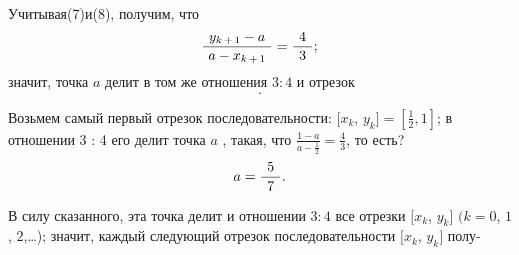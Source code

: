 \begin{minipage}[t]{0.45\linewidth}
Учитывая\hspace{2mm}(7)\hspace{2mm}и\hspace{2mm}(8), получим, что
\begin{equation}
    \frac{\hspace{1.5mm}y_{k\hspace{0.5mm}+\hspace{0.5mm}1} - a\hspace{1.5mm}}{a - x_{k\hspace{0.5mm}+\hspace{0.5mm}1}} = \frac{\hspace{1.5mm}4\hspace{1.5mm}}{3};
\end{equation}
значит, точка $a$ делит в том же отношения $3:4$ и отрезок
\begin{equation*}
    [x_{k + 1}, \hspace{1mm}y_{k+1}].
\end{equation*}

Возьмем самый первый отрезок последовательности: $[x_k$, \hspace{1mm}$y_k] = [\frac{1}{2},1]$; в отношении 3 : 4 
его делит точка $a$ , такая, что $\frac{1 - a}{a - \frac{1}{2}} = \frac{4}{3}$, то есть?
\begin{equation}
    a = \frac{\hspace{1.5mm}5\hspace{1.5mm}}{7}.
\end{equation}

В силу сказанного, эта точка делит и отношении $3:4$ все отрезки $[x_k$, \hspace{1mm}$y_k]$ \hspace{1mm}$(k = 0$, \hspace{1mm}$1$, \hspace{1mm}$2$,\hspace{1mm}\ldots); значит, каждый следующий отрезок последовательности $[x_k$, \hspace{1mm}$y_k]$ полу-
\end{minipage}


